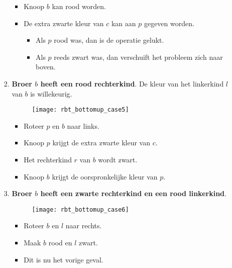 \begin{itemize}
\begin{enumerate}
\begin{enumerate}
\begin{itemize}
                \item Knoop $b$ kan rood worden.
                \item De extra zwarte kleur van $c$ kan aan $p$ gegeven worden.
                \begin{itemize}
                    \item Als $p$ rood was, dan is de operatie gelukt.
                    \item Als $p$ reeds zwart was, dan verschuift het probleem zich naar boven.
                \end{itemize}
            \end{itemize}
            \item \textbf{Broer $b$ heeft een rood rechterkind}. De kleur van het linkerkind $l$ van $b$ is willekeurig.
            \begin{figure}[ht]
                \centering
                \texttt{[image: rbt\_bottomup\_case5]}
                \caption{}
                \label{fig:rbt_bottomup_case5}
            \end{figure}
            \begin{itemize}
                \item Roteer $p$ en $b$ naar links.
                \item Knoop $p$ krijgt de extra zwarte kleur van $c$.
                \item Het rechterkind $r$ van $b$ wordt zwart.
                \item Knoop $b$ krijgt de oorspronkelijke kleur van $p$.
            \end{itemize}
            \item \textbf{Broer $b$ heeft een zwarte rechterkind en een rood linkerkind}.
            \begin{figure}[ht]
                \centering
                \texttt{[image: rbt\_bottomup\_case6]}
                \caption{}
                \label{fig:rbt_bottomup_case6}
            \end{figure}
            \begin{itemize}
                \item Roteer $b$ en $l$ naar rechts.
                \item Maak $b$ rood en $l$ zwart.
                \item Dit is nu het vorige geval.
            \end{itemize}
        \end{enumerate}

\end{enumerate}
\end{itemize}
